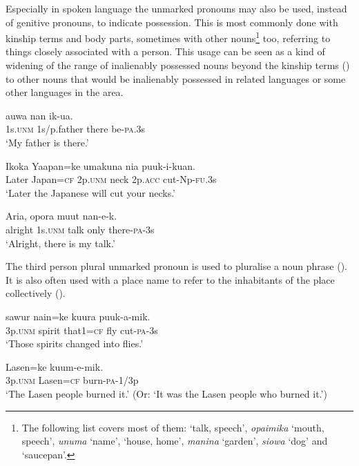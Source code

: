 Especially in spoken language the unmarked pronouns may also be used, instead of genitive pronouns, to indicate possession. This is most commonly done with kinship terms and body parts, sometimes with other nouns\footnote{The following list covers most of them:  `talk, speech', \textit{opaimika} `mouth, speech', \textit{unuma} `name',  `house, home', \textit{manina} `garden', \textit{siowa} `dog' and  `saucepan'.} too, referring to things closely associated with a person. This usage can be seen as a kind of widening of the range of inalienably possessed nouns beyond the kinship terms () to other nouns that would be inalienably possessed in related languages or some other languages in the area. 

\ea%
\label{ex:x537}
\gll {} auwa nan ik-ua. \\
1s.\textsc{unm} 1s/p.father there be-\textsc{pa}.3s\\
\glt`My father is there.'
\z

\ea%
\label{ex:x538}
\gll Ikoka Yaapan=ke   umakuna nia puuk-i-kuan. \\
Later Japan=\textsc{cf} 2p.\textsc{unm} neck 2p.\textsc{acc} cut-Np-\textsc{fu}.3s\\
\glt`Later the Japanese will cut your necks.'
\z

\ea%
\label{ex:x1804}
\gll Aria,  opora muut nan-e-k. \\
alright 1s.\textsc{unm} talk only there-\textsc{pa}-3s\\
\glt`Alright, there is my talk.'
\z

The third person plural unmarked pronoun is used to pluralise a noun phrase (). It is also often used with a place name to refer to the inhabitants of the place collectively ().

\ea%
\label{ex:x625}
\gll {} sawur nain=ke kuura puuk-a-mik. \\
3p.\textsc{unm} spirit that1=\textsc{cf} fly cut-\textsc{pa}-3s\\
\glt`Those spirits changed into flies.'
\z

\ea%
\label{ex:x626}
\gll {} Lasen=ke kuum-e-mik. \\
3p.\textsc{unm} Lasen=\textsc{cf} burn-\textsc{pa}-1/3p\\
\glt`The Lasen people burned it.' (Or: `It was the Lasen people who burned it.')
\z

